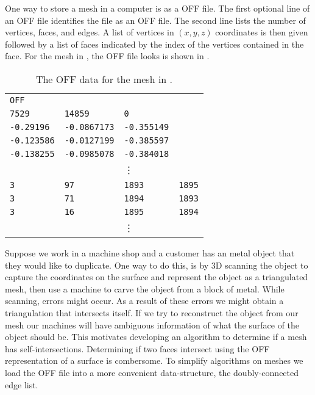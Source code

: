One way to store a mesh in a computer is as a OFF file.
The first optional line of an OFF file identifies the file as an OFF file.
The second line lists the number of vertices, faces, and edges.
A list of vertices in $(x,y,z)$ coordinates is then given followed
by a list of faces indicated by the index of the vertices contained in the face.
For the mesh in , the OFF file looks is shown in 
.

\begin{table}[h!]
\caption{The OFF data for the mesh in .}
\centering
\begin{tabular}{|p{2cm} p{2cm} p{2cm} p{2cm}|} 
 \hline
\texttt{OFF} &  & &  \\ 
\texttt{7529} & \texttt{14859} & \texttt{0} &  \\ 
\texttt{-0.29196} & \texttt{-0.0867173} & \texttt{-0.355149}  &  \\
 \texttt{-0.123586}   & \texttt{-0.0127199} & \texttt{-0.385597} &  \\
\texttt{-0.138255}   & \texttt{-0.0985078} & \texttt{-0.384018} &  \\
  & &\vdots &  \\  
 \texttt{3}&  \texttt{97} &\texttt{1893}& \texttt{1895}\\
 \texttt{3}& \texttt{71} & \texttt{1894} & \texttt{1893} \\
 \texttt{3} & \texttt{16} & \texttt{1895} & \texttt{1894}\\
   & &\vdots &  \\  
 \hline
\end{tabular}

\label{tab:off}
\end{table}

Suppose we work in a machine shop and a customer has an metal object that they would like
to duplicate.
One way to do this, is by 3D scanning the object to capture the coordinates on the 
surface and represent the object as a triangulated mesh, then use a machine to carve the object
from a block of metal. 
While scanning, errors might occur. As a result of these errors
we might obtain a triangulation that intersects itself. If we try to reconstruct the object
from our mesh our machines will have ambiguous information of what the surface of the object
should be.
This motivates developing an algorithm to determine if a mesh has self-intersections.
Determining if two faces intersect using the OFF representation of a surface is combersome.
To simplify algorithms on meshes we load the OFF file into a more convenient data-structure,
the doubly-connected edge list.

